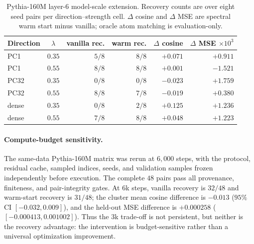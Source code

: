 \documentclass{article}
\theoremstyle{plain}
\begin{document}
{\begin{table}[H]
\caption{Pythia-160M layer-$6$ model-scale extension. Recovery counts are over eight seed pairs per direction--strength cell. $\Delta$ cosine and $\Delta$ MSE are spectral warm start minus vanilla; oracle atom matching is evaluation-only.}
\label{tab:scale_extension}
\begin{center}
\scriptsize
\setlength{\tabcolsep}{5pt}
\begin{tabular}{@{}lcrrrr@{}}
\toprule
Direction & $\lambda$ & vanilla rec. & warm rec. & $\Delta$ cosine & $\Delta$ MSE $\times10^3$ \\
\midrule
PC1 & $0.35$ & $5/8$ & $8/8$ & $+0.071$ & $+0.911$ \\
PC1 & $0.55$ & $8/8$ & $8/8$ & $+0.001$ & $-1.521$ \\
PC32 & $0.35$ & $0/8$ & $0/8$ & $-0.023$ & $+1.759$ \\
PC32 & $0.55$ & $8/8$ & $7/8$ & $-0.019$ & $+0.380$ \\
dense & $0.35$ & $0/8$ & $2/8$ & $+0.125$ & $+1.236$ \\
dense & $0.55$ & $7/8$ & $8/8$ & $+0.048$ & $+1.223$ \\
\bottomrule
\end{tabular}
\end{center}
\end{table}

\paragraph{Compute-budget sensitivity.}
The same-data Pythia-160M matrix was rerun at $6{,}000$ steps, with the protocol, residual cache, sampled indices, seeds, and validation samples frozen independently before execution. The complete $48$ pairs pass all provenance, finiteness, and pair-integrity gates. At $6$k steps, vanilla recovery is $32/48$ and warm-start recovery is $31/48$; the cluster mean cosine difference is $-0.013$ ($95\%$ CI $[-0.032,0.009]$), and the held-out MSE difference is $+0.000258$ ($[-0.000413,0.001002]$). Thus the $3$k trade-off is not persistent, but neither is the recovery advantage: the intervention is budget-sensitive rather than a universal optimization improvement.

}
\end{document}
